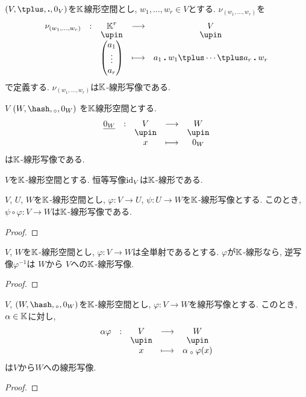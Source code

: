 \begin{example}
  $(V,\plus,\act,0_V)$を$\mathbb{K}$線形空間とし,
  $w_1,\ldots,w_r\in V$とする.
  $\nu_{(w_1,\ldots,w_r)}$を
    \begin{align*}
      \shazo{\nu_{(w_1,\ldots,w_r)}}{\KK^r}{V}
      {\begin{pmatrix}a_1\\\vdots\\a_r\end{pmatrix}}{a_1\act w_1\plus\cdots\plus a_r\act w_r}
    \end{align*}
    で定義する.
  $\nu_{(w_1,\ldots,w_r)}$は$\mathbb{K}$-線形写像である.
\end{example}

\begin{example}
  $V$
  $(W,\pplus,\aact,0_W)$
  を$\mathbb{K}$線形空間とする.
    \begin{align*}
      \shazo{\underline{0_W}}{V}{W}
      {x}{0_W}
    \end{align*}
  は$\mathbb{K}$-線形写像である.
\end{example}


\begin{example}
  $V$を$\mathbb{K}$-線形空間とする.
  恒等写像$\operatorname{id}_V$は$\mathbb{K}$-線形である.
\end{example}



\begin{example}
  $V$, $U$, $W$を$\mathbb{K}$-線形空間とし,
  $\varphi\colon V\to U$,
  $\psi\colon U\to W$を$\mathbb{K}$-線形写像とする.
  このとき, $\psi\circ\varphi\colon V\to W$は$\mathbb{K}$-線形写像である.
\end{example}
\begin{proof}\end{proof}

\begin{example}
  $V$, $W$を$\mathbb{K}$-線形空間とし,
  $\varphi\colon V\to W$は全単射であるとする.
  $\varphi$が$\mathbb{K}$-線形なら,
  逆写像$\varphi^{-1}$は
  $W$から
  $V$への$\mathbb{K}$-線形写像.
\end{example}
\begin{proof}\end{proof}

\begin{example}
  $V$, $(W,\pplus,\aact,0_W)$を$\mathbb{K}$-線形空間とし,
  $\varphi\colon V\to W$を線形写像とする.
  このとき, $\alpha \in \mathbb{K}$に対し,
  \begin{align*}
  \shazo{\alpha\varphi}{V}{W}
  {x}{\alpha\aact \varphi(x)}
  \end{align*}
  は$V$から$W$への線形写像.
\end{example}
\begin{proof}\end{proof}

